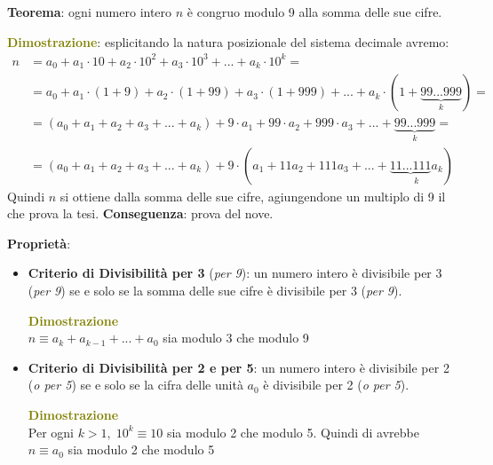 \newpage
\begin{flushleft}
    \textbf{Teorema}: ogni numero intero $n$ è congruo modulo 9 alla somma delle sue cifre.
    
    \begin{boxA}
        \textcolor{olive}{\textbf{Dimostrazione}}: esplicitando la natura posizionale del sistema decimale avremo:
        \begin{align*}
            n &= a_0 + a_1 \cdot 10 + a_2 \cdot 10^2 + a_3 \cdot 10^3 + ... + a_k \cdot 10^k = \\
            &= a_0 + a_1 \cdot (1 + 9) + a_2 \cdot (1 + 99) + a_3 \cdot (1 + 999) + ...+ a_k \cdot (1 + \underset{k}{\underbrace{99...999}}) = \\
            &= (a_0 + a_1 + a_2 + a_3 + ... + a_k) + 9 \cdot a_1 + 99 \cdot a_2 + 999 \cdot a_3 + ... + \underset{k}{\underbrace{99...999}} = \\
            &= (a_0 + a_1 + a_2 + a_3 + ... + a_k) + 9 \cdot (a_1 + 11 a_2 + 111 a_3 + ... + \underset{k}{\underbrace{11...111} a_k})
        \end{align*}
        Quindi $n$ si ottiene dalla somma delle sue cifre, agiungendone un multiplo di 9 il che prova la tesi. \textbf{Conseguenza}: prova del nove.
    \end{boxA}

        \textbf{Proprietà}:
        \begin{itemize}[nosep]
            \item \textbf{Criterio di Divisibilità per 3} (\textit{per 9}): un numero intero è divisibile per 3 (\textit{per 9}) se e solo se la somma delle sue cifre è divisibile per 3 (\textit{per 9}).
            \begin{boxA}
                \textcolor{olive}{\textbf{Dimostrazione}} \\
                $n \equiv a_k + a_{k-1} + ... + a_0$ sia modulo 3 che modulo 9
            \end{boxA}
            
            \item \textbf{Criterio di Divisibilità per 2 e per 5}: un numero intero è divisibile per 2 (\textit{o per 5}) se e solo se la cifra delle unità $a_0$ è divisibile per 2 (\textit{o per 5}).
            \begin{boxA}
                \textcolor{olive}{\textbf{Dimostrazione}} \\
                Per ogni $k > 1, \; 10^k \equiv 10$ sia modulo 2 che modulo 5. Quindi di avrebbe $n \equiv a_0$ sia modulo 2 che modulo 5
            \end{boxA}
            

\end{itemize}
\end{flushleft}
